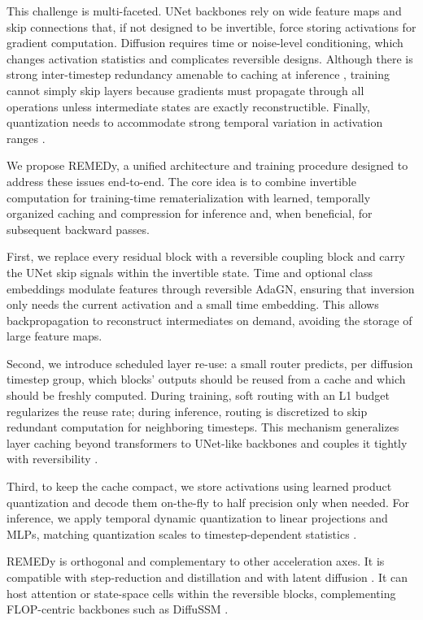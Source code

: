 \documentclass{article}
\begin{document}
This challenge is multi-faceted. UNet backbones rely on wide feature maps and skip connections that, if not designed to be invertible, force storing activations for gradient computation. Diffusion requires time or noise-level conditioning, which changes activation statistics and complicates reversible designs. Although there is strong inter-timestep redundancy amenable to caching at inference \cite{ma_2024_learning}, training cannot simply skip layers because gradients must propagate through all operations unless intermediate states are exactly reconstructible. Finally, quantization needs to accommodate strong temporal variation in activation ranges \cite{so_2023_temporal}.

We propose REMEDy, a unified architecture and training procedure designed to address these issues end-to-end. The core idea is to combine invertible computation for training-time rematerialization with learned, temporally organized caching and compression for inference and, when beneficial, for subsequent backward passes.

First, we replace every residual block with a reversible coupling block and carry the UNet skip signals within the invertible state. Time and optional class embeddings modulate features through reversible AdaGN, ensuring that inversion only needs the current activation and a small time embedding. This allows backpropagation to reconstruct intermediates on demand, avoiding the storage of large feature maps.

Second, we introduce scheduled layer re-use: a small router predicts, per diffusion timestep group, which blocks' outputs should be reused from a cache and which should be freshly computed. During training, soft routing with an L1 budget regularizes the reuse rate; during inference, routing is discretized to skip redundant computation for neighboring timesteps. This mechanism generalizes layer caching beyond transformers to UNet-like backbones and couples it tightly with reversibility \cite{ma_2024_learning}.

Third, to keep the cache compact, we store activations using learned product quantization and decode them on-the-fly to half precision only when needed. For inference, we apply temporal dynamic quantization to linear projections and MLPs, matching quantization scales to timestep-dependent statistics \cite{so_2023_temporal}.

REMEDy is orthogonal and complementary to other acceleration axes. It is compatible with step-reduction and distillation \cite{salimans_2024_multistep} and with latent diffusion \cite{rombach_2021_high}. It can host attention or state-space cells within the reversible blocks, complementing FLOP-centric backbones such as DiffuSSM \cite{yan_2023_diffusion}.
\end{document}
